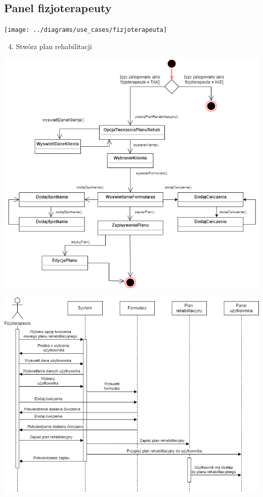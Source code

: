 \subsection{Panel fizjoterapeuty}\label{subsec:panel-fizjoterapeuty}

{\texttt{[image: ../diagrams/use\_cases/fizjoterapeuta]}}

\begin{enumerate}
\setcounter{enumi}{3}
\tightlist
\item
  {Stwórz plan rehabilitacji}
\end{enumerate}


{\includegraphics{../diagrams/state/tworzenie_planu_rehabilitacyjnego}}

{\includegraphics{../diagrams/sequence/tworzenie_planu_rehabilitacyjnego_sekwencja}}

